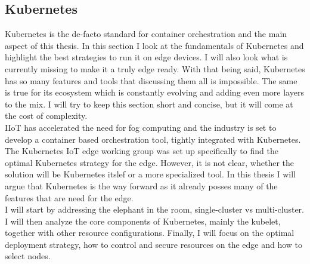 \subsection{Kubernetes}
Kubernetes is the de-facto standard for container orchestration and the main aspect of this thesis. In this section I look at the fundamentals of Kubernetes and highlight the best strategies to run it on edge devices. I will also look what is currently missing to make it a truly edge ready. With that being said, Kubernetes has so many features and tools that discussing them all is impossible. The same is true for its ecosystem which is constantly evolving and adding even more layers to the mix. I will try to keep this section short and concise, but it will come at the cost of complexity.\\
IIoT has accelerated the need for fog computing and the industry is set to develop a container based orchestration tool, tightly integrated with Kubernetes. The Kubernetes IoT edge working group was set up specifically to find the optimal Kubernetes strategy for the edge. However, it is not clear, whether the solution will be Kubernetes itslef or a more specialized tool. In this thesis I will argue that Kubernetes is the way forward as it already posses many of the features that are need for the edge.\\ 
I will start by addressing the elephant in the room, single-cluster vs multi-cluster. I will then analyze the core components of Kubernetes, mainly the kubelet, together with other resource configurations. Finally, I will focus on the optimal deployment strategy, how to control and secure resources on the edge and how to select nodes.





